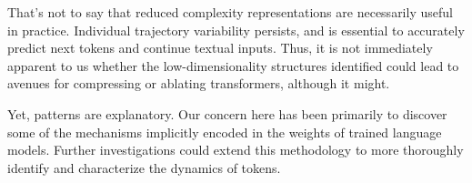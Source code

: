 \documentclass{article} %
\begin{document}
That's not to say that reduced complexity representations are necessarily useful in practice.
Individual trajectory variability persists, and is essential to accurately predict next tokens and continue textual inputs.
Thus, it is not immediately apparent to us whether the low-dimensionality structures identified could lead to avenues for compressing or ablating transformers, although it might.

Yet, patterns are explanatory. 
Our concern here has been primarily to discover some of the mechanisms implicitly encoded in the weights of trained language models.
Further investigations could extend this methodology to more thoroughly identify and characterize the dynamics of tokens.










\end{document}
